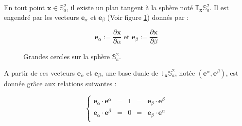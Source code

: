 En tout point $\mathbf{x} \in \mathbb{S}_a^2$, il existe un plan tangent à la sphère noté $\mathbb{T}_{\mathbf{x}}\mathbb{S}_a^2$. Il est engendré par les vecteurs $\mathbf{e}_{\alpha}$ et $\mathbf{e}_{\beta}$ (Voir figure \ref{fig: e_alpha et e_beta}) donnés par :

\begin{equation}
\mathbf{e}_{\alpha} := \dfrac{\partial \mathbf{x}}{\partial \alpha} \text{ et } \mathbf{e}_{\beta} := \dfrac{\partial \mathbf{x}}{\partial \beta}
\end{equation}

\begin{figure}[ht]
\begin{center}
\end{center}
\caption{Grandes cercles sur la sphère $\mathbb{S}_a^2$.}
\label{fig: e_alpha et e_beta}
\end{figure}

A partir de ces vecteurs $\mathbf{e}_{\alpha}$ et $\mathbf{e}_{\beta}$, une base duale de $\mathbb{T}_{\mathbf{x}}\mathbb{S}_a^2$, notée $\left( \mathbf{e}^{\alpha}, \mathbf{e}^{\beta} \right)$, est donnée grâce aux relations suivantes :

\begin{equation}
\left\lbrace
\begin{array}{rcccl}
\mathbf{e}_{\alpha} \cdot \mathbf{e}^{\alpha} & = & 1 & = & \mathbf{e}_{\beta} \cdot \mathbf{e}^{\beta} \\
\mathbf{e}_{\alpha} \cdot \mathbf{e}^{\beta} & = & 0 & = & \mathbf{e}_{\beta} \cdot \mathbf{e}^{\alpha} \\
\end{array}
\right.
\end{equation}


